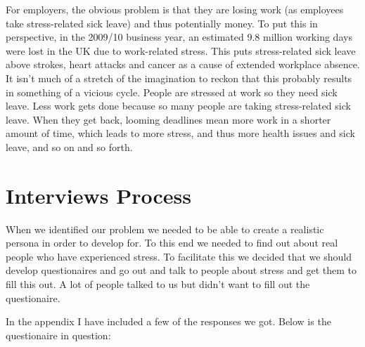 \documentclass{scrartcl}
\begin{document}
For employers, the obvious problem is that they are losing work (as employees take stress-related sick leave) and thus
potentially money. To put this in perspective, in the 2009/10 business year, an estimated 9.8 million working days
were lost in the UK due to work-related stress. This puts stress-related sick leave above strokes, heart attacks and
cancer as a cause of extended workplace absence. It isn't much of a stretch of the imagination to reckon that this
probably results in something of a vicious cycle. People are stressed at work so they need sick leave. Less work gets
done because so many people are taking stress-related sick leave. When they get back, looming deadlines mean more work
in a shorter amount of time, which leads to more stress, and thus more health issues and sick leave, and so on and so forth.

\section{Interviews Process}
When we identified our problem we needed to be able to create a realistic persona
in order to develop for. To this end we needed to find out about real people
who have experienced stress. To facilitate this we decided that we should
develop questionaires and go out and talk to people about stress and get them to 
fill this out. A lot of people talked to us but didn't want to fill out the 
questionaire.

In the appendix I have included a few of the responses we got. Below is the 
questionaire in question:

\end{document}

